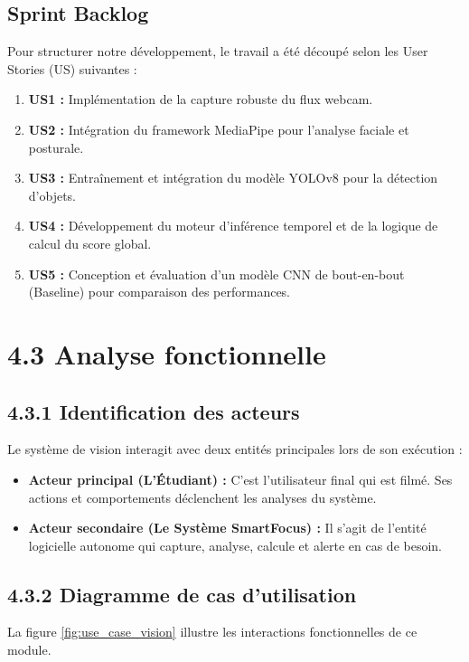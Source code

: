 \subsection{ Sprint Backlog}
Pour structurer notre développement, le travail a été découpé selon les User Stories (US) suivantes :
\begin{enumerate}
    \item \textbf{US1 :} Implémentation de la capture robuste du flux webcam.
    \item \textbf{US2 :} Intégration du framework MediaPipe pour l'analyse faciale et posturale.
    \item \textbf{US3 :} Entraînement et intégration du modèle YOLOv8 pour la détection d'objets.
    \item \textbf{US4 :} Développement du moteur d'inférence temporel et de la logique de calcul du score global.
    \item \textbf{US5 :} Conception et évaluation d'un modèle CNN de bout-en-bout (Baseline) pour comparaison des performances.
\end{enumerate}


\section{4.3 Analyse fonctionnelle}

\subsection{4.3.1 Identification des acteurs}
Le système de vision interagit avec deux entités principales lors de son exécution :
\begin{itemize}
    \item \textbf{Acteur principal (L'Étudiant) :} C'est l'utilisateur final qui est filmé. Ses actions et comportements déclenchent les analyses du système.
    \item \textbf{Acteur secondaire (Le Système SmartFocus) :} Il s'agit de l'entité logicielle autonome qui capture, analyse, calcule et alerte en cas de besoin.
\end{itemize}

\subsection{4.3.2 Diagramme de cas d’utilisation}
La figure \ref{fig:use_case_vision} illustre les interactions fonctionnelles de ce module.

